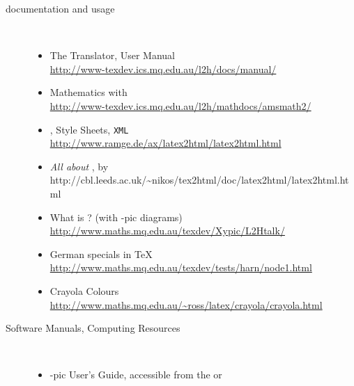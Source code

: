\begin{description}
%
\item [\latextohtml{} documentation and usage]~%
\begin{itemize}
\item 
The \latextohtml{} Translator, User Manual\\
\url{http://www-texdev.ics.mq.edu.au/l2h/docs/manual/}\\
\onlinedoc
\html{\smallskip}%

\item 
Mathematics with \latextohtml{}\\
\url{http://www-texdev.ics.mq.edu.au/l2h/mathdocs/amsmath2/}
\html{\smallskip}%

\item 
\latextohtml, Style Sheets, \texttt{XML}\\
\url{http://www.ramge.de/ax/latex2html/latex2html.html}
\html{\smallskip}%

\item
\textit{All about }\latextohtml, by %
{http://cbl.leeds.ac.uk/\~{}nikos/tex2html/doc/latex2html/latex2html.html}
\html{\smallskip}%

\item 
What is \latextohtml{}? (with \Xy-pic diagrams)\\
\url{http://www.maths.mq.edu.au/texdev/Xypic/L2Htalk/}
\html{\smallskip}%

\item 
German specials in \TeX\\
\url{http://www.maths.mq.edu.au/texdev/tests/harn/node1.html}
\html{\smallskip}%

\item
Crayola Colours\\
\url{http://www.maths.mq.edu.au/~ross/latex/crayola/crayola.html}
\html{\smallskip}%


%

\end{itemize}

\htmlrule[50\% center]


\item[Software Manuals, Computing Resources]~%
\begin{itemize}
%
\item 
\Xy-pic User's Guide, accessible from the 
or 
\html{\smallskip}%


\end{itemize}
\end{description}
